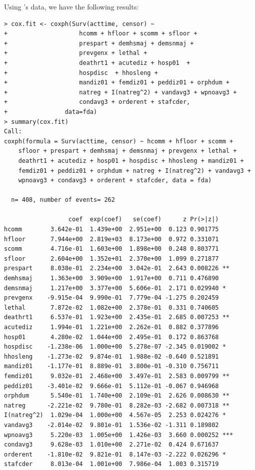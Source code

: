 Using \citet{keele2010proportionally}'s data, we have the following results:
\begin{lstlisting}
> cox.fit <- coxph(Surv(acttime, censor) ~ 
+                    hcomm + hfloor + scomm + sfloor + 
+                    prespart + demhsmaj + demsnmaj + 
+                    prevgenx + lethal + 
+                    deathrt1 + acutediz + hosp01  + 
+                    hospdisc  + hhosleng + 
+                    mandiz01 + femdiz01 + peddiz01 + orphdum + 
+                    natreg + I(natreg^2) + vandavg3 + wpnoavg3 + 
+                    condavg3 + orderent + stafcder, 
+                data=fda)
> summary(cox.fit)
Call:
coxph(formula = Surv(acttime, censor) ~ hcomm + hfloor + scomm + 
    sfloor + prespart + demhsmaj + demsnmaj + prevgenx + lethal + 
    deathrt1 + acutediz + hosp01 + hospdisc + hhosleng + mandiz01 + 
    femdiz01 + peddiz01 + orphdum + natreg + I(natreg^2) + vandavg3 + 
    wpnoavg3 + condavg3 + orderent + stafcder, data = fda)

  n= 408, number of events= 262 

                  coef  exp(coef)   se(coef)      z Pr(>|z|)    
hcomm        3.642e-01  1.439e+00  2.951e+00  0.123 0.901775    
hfloor       7.944e+00  2.819e+03  8.173e+00  0.972 0.331071    
scomm        4.716e-01  1.603e+00  1.898e+00  0.248 0.803771    
sfloor       2.604e+00  1.352e+01  2.370e+00  1.099 0.271877    
prespart     8.038e-01  2.234e+00  3.042e-01  2.643 0.008226 ** 
demhsmaj     1.363e+00  3.909e+00  1.917e+00  0.711 0.476890    
demsnmaj     1.217e+00  3.377e+00  5.606e-01  2.171 0.029940 *  
prevgenx    -9.915e-04  9.990e-01  7.779e-04 -1.275 0.202459    
lethal       7.872e-02  1.082e+00  2.378e-01  0.331 0.740605    
deathrt1     6.537e-01  1.923e+00  2.435e-01  2.685 0.007253 ** 
acutediz     1.994e-01  1.221e+00  2.262e-01  0.882 0.377896    
hosp01       4.280e-02  1.044e+00  2.495e-01  0.172 0.863768    
hospdisc    -1.238e-06  1.000e+00  5.278e-07 -2.345 0.019002 *  
hhosleng    -1.273e-02  9.874e-01  1.988e-02 -0.640 0.521891    
mandiz01    -1.177e-01  8.889e-01  3.800e-01 -0.310 0.756711    
femdiz01     9.032e-01  2.468e+00  3.497e-01  2.583 0.009799 ** 
peddiz01    -3.401e-02  9.666e-01  5.112e-01 -0.067 0.946968    
orphdum      5.540e-01  1.740e+00  2.109e-01  2.626 0.008630 ** 
natreg      -2.221e-02  9.780e-01  8.282e-03 -2.682 0.007318 ** 
I(natreg^2)  1.029e-04  1.000e+00  4.567e-05  2.253 0.024276 *  
vandavg3    -2.014e-02  9.801e-01  1.536e-02 -1.311 0.189802    
wpnoavg3     5.220e-03  1.005e+00  1.426e-03  3.660 0.000252 ***
condavg3     9.628e-03  1.010e+00  2.271e-02  0.424 0.671637    
orderent    -1.810e-02  9.821e-01  8.147e-03 -2.222 0.026296 *  
stafcder     8.013e-04  1.001e+00  7.986e-04  1.003 0.315719    
\end{lstlisting}


